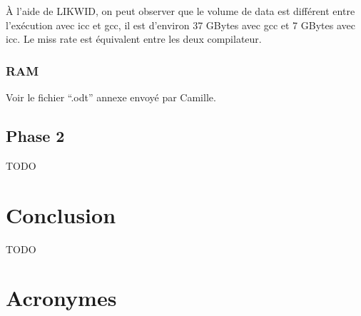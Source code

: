 \documentclass[12pt,a4paper]{article}
\begin{document}
À l'aide de LIKWID, on peut observer que le volume de data est différent 
entre l’exécution avec icc et gcc, il est d'environ 37 GBytes avec gcc et
7 GBytes avec icc. Le miss rate est équivalent entre les deux compilateur.

\subsubsection{RAM}

Voir le fichier \enquote{.odt} annexe envoyé par Camille.

\subsection{Phase 2}

TODO 

\section{Conclusion}

TODO

\newpage
\section*{Acronymes}

\begin{acronym}
\end{acronym}
\end{document}
